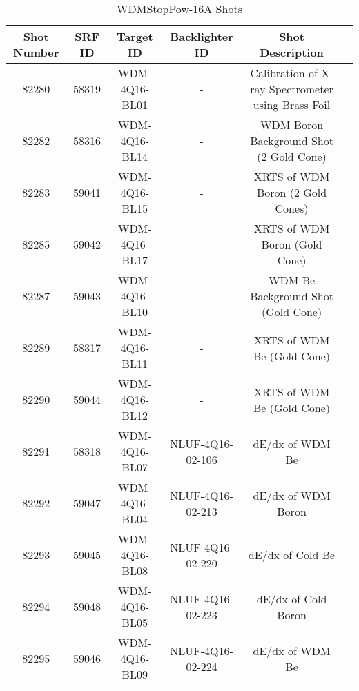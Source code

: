 \begin{sidewaystable}[h!]
    \def\arraystretch{1.5}
    \centering
    \begin{tabular}{c c c c c c}
    Shot Number & SRF ID & Target ID & Backlighter ID & Shot Description \\
    \hline
82280 & 58319 & WDM-4Q16-BL01 & - & Calibration of X-ray Spectrometer using Brass Foil\\
82282 & 58316 & WDM-4Q16-BL14 & - & WDM Boron Background Shot (2 Gold Cone)\\
82283 & 59041 & WDM-4Q16-BL15 & - & XRTS of WDM Boron (2 Gold Cones)\\
82285 & 59042 & WDM-4Q16-BL17 & - & XRTS of WDM Boron (Gold Cone)\\
82287 & 59043 & WDM-4Q16-BL10 & - & WDM Be Background Shot (Gold Cone)\\
82289 & 58317 & WDM-4Q16-BL11 & - & XRTS of WDM Be (Gold Cone)\\
82290 & 59044 & WDM-4Q16-BL12 & - & XRTS of WDM Be (Gold Cone)\\
82291 & 58318 & WDM-4Q16-BL07 & NLUF-4Q16-02-106 & dE/dx of WDM Be\\
82292 & 59047 & WDM-4Q16-BL04 & NLUF-4Q16-02-213 & dE/dx of WDM Boron\\
82293 & 59045 & WDM-4Q16-BL08 & NLUF-4Q16-02-220 & dE/dx of Cold Be\\
82294 & 59048 & WDM-4Q16-BL05 & NLUF-4Q16-02-223 & dE/dx of Cold Boron\\
82295 & 59046 & WDM-4Q16-BL09 & NLUF-4Q16-02-224 & dE/dx of WDM Be\\
    \end{tabular}
    \caption{WDMStopPow-16A Shots}
    \label{tab:my_label}
\end{sidewaystable}

